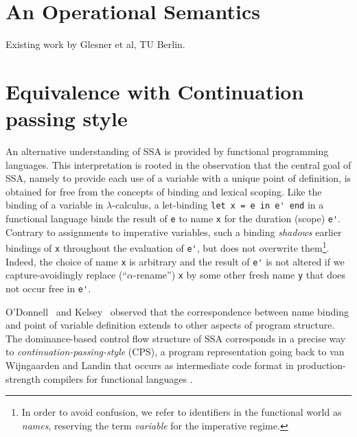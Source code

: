 
\section{An Operational Semantics}
\label{section:Part1:Semantics:GlesnerSemantics}

Existing work by Glesner et al, TU Berlin.



\section{Equivalence with Continuation passing style}
\label{section:Part1:Semantics:FunctionalLanguages}

An alternative understanding of SSA is provided by functional
programming languages. This interpretation is rooted in the
observation that the central goal of SSA, namely to provide each use
of a variable with a unique point of definition, is obtained for free
from the concepts of binding and lexical scoping. Like the binding of
a variable in $\lambda$-calculus, a let-binding
\verb|let x = e in e' end| in a functional language binds the result
of \verb|e| to name \verb|x| for the duration (scope) \verb|e'|.
Contrary to assignments to imperative variables, such a binding
\emph{shadows} earlier bindings of \verb|x| throughout the evaluation
of \verb|e'|, but does not overwrite them\footnote{In order to avoid
  confusion, we refer to identifiers in the functional world as
  \emph{names}, reserving the term \emph{variable} for the imperative
  regime.}. Indeed, the choice of name \verb|x| is arbitrary and the
result of \verb|e'| is not altered if we capture-avoidingly replace
(``$\alpha$-rename'') \verb|x| by some other fresh name \verb|y| that
does not occur free in \verb|e'|.

O'Donnell~\cite{ODonnellPhD} and Kelsey~\cite{Kelsey95} observed that
the correspondence between name binding and point of variable
definition extends to other aspects of program structure. The
dominance-based control flow structure of SSA corresponds in a precise
way to \emph{continuation-passing-style} (CPS), a program
representation going back to van Wijngaarden
\cite{vanWijngaarden1966} and Landin \cite{Landin1965} that occurs as intermediate code format in
production-strength compilers for functional languages
\cite{DBLP:journals/lisp/SussmanS98a,Appel:CWC}.

